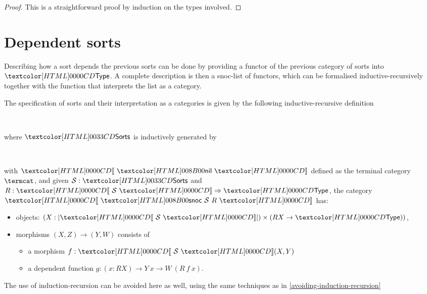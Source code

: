 \begin{proof}
  This is a straightforward proof by induction on the types involved.
\end{proof}

\section{Dependent sorts}

Describing how a sort depends the previous sorts can be done by
providing a functor of the previous category of sorts into $\Type$. A
complete description is then a snoc-list of functors, which can be
formalised inductive-recursively together with the function that
interprets the list as a category.
% 
\begin{definition}
  The specification of sorts and their interpretation as a
  categories is given by the following inductive-recursive
  definition
  \begin{sorts}
    \sortnamety{\sortsty}{\Type} \\
    \functy{\SortCat{\_}}{\sortsty \to \Cat}
  \end{sorts}
  where $\sortsty$ is inductively generated by
  \begin{datatype}{\sortsty}{}
    \constr{\sortsnil}{\sortsty} \\
    \constr{\sortssnoc}{(\Ss : \sortsty) \to (\Func{\SortCat{\Ss}}{\Type}) \to \sortsty}
  \end{datatype}
  with $\SortCat{\sortsnil}$ defined as the terminal category $\termcat$, and given
  $\Ss : \sortsty$ and $R : \Func{\SortCat{\Ss}}{\Type}$,
  the category $\SortCat{\sortssnoc\ \Ss\ R}$ has:
  \begin{itemize}
  \item objects: $(X : | \SortCat{\Ss} |) \times (R X \to \Type))$,
  \item morphisms $(X,Z) \to (Y,W)$ consists of
    \begin{itemize}
    \item a morphism $f : \SortCat{\Ss}(X,Y)$
    \item a dependent function
      $g : (x : R X) \to Y\ x \to W\ (R\ f\ x)$.
    \end{itemize}
  \end{itemize}
\end{definition}

\begin{remark}
  The use of induction-recursion can be avoided here as well, using
  the same techniques as in \cref{avoiding-induction-recursion}
\end{remark}

